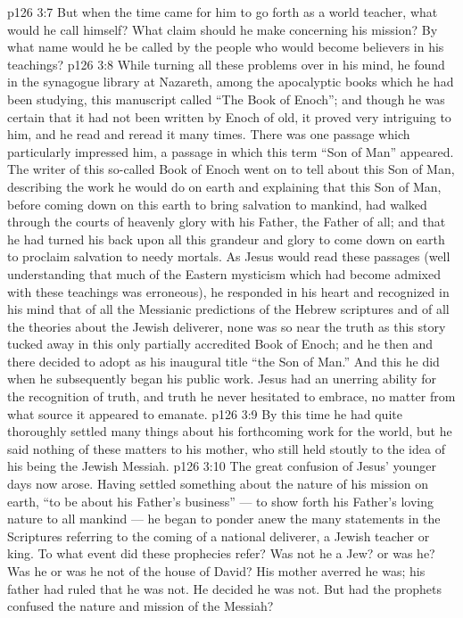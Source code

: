 \vs p126 3:7 But when the time came for him to go forth as a world teacher, what would he call himself? What claim should he make concerning his mission? By what name would he be called by the people who would become believers in his teachings?
\vs p126 3:8 \pc While turning all these problems over in his mind, he found in the synagogue library at Nazareth, among the apocalyptic books which he had been studying, this manuscript called “The Book of Enoch”; and though he was certain that it had not been written by Enoch of old, it proved very intriguing to him, and he read and reread it many times. There was one passage which particularly impressed him, a passage in which this term “Son of Man” appeared. The writer of this so\hyp{}called Book of Enoch went on to tell about this Son of Man, describing the work he would do on earth and explaining that this Son of Man, before coming down on this earth to bring salvation to mankind, had walked through the courts of heavenly glory with his Father, the Father of all; and that he had turned his back upon all this grandeur and glory to come down on earth to proclaim salvation to needy mortals. As Jesus would read these passages (well understanding that much of the Eastern mysticism which had become admixed with these teachings was erroneous), he responded in his heart and recognized in his mind that of all the Messianic predictions of the Hebrew scriptures and of all the theories about the Jewish deliverer, none was so near the truth as this story tucked away in this only partially accredited Book of Enoch; and he then and there decided to adopt as his inaugural title “the Son of Man.” And this he did when he subsequently began his public work. Jesus had an unerring ability for the recognition of truth, and truth he never hesitated to embrace, no matter from what source it appeared to emanate.
\vs p126 3:9 By this time he had quite thoroughly settled many things about his forthcoming work for the world, but he said nothing of these matters to his mother, who still held stoutly to the idea of his being the Jewish Messiah.
\vs p126 3:10 The great confusion of Jesus’ younger days now arose. Having settled something about the nature of his mission on earth, “to be about his Father’s business” --- to show forth his Father’s loving nature to all mankind --- he began to ponder anew the many statements in the Scriptures referring to the coming of a national deliverer, a Jewish teacher or king. To what event did these prophecies refer? Was not he a Jew? or was he? Was he or was he not of the house of David? His mother averred he was; his father had ruled that he was not. He decided he was not. But had the prophets confused the nature and mission of the Messiah?
